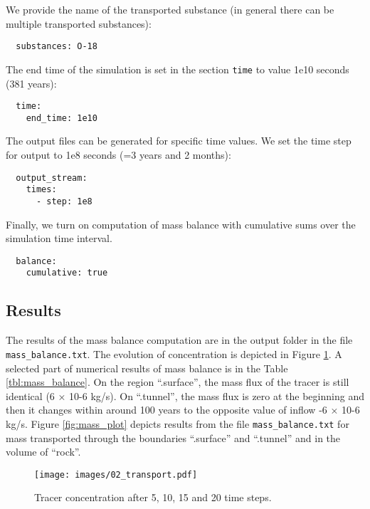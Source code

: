 We provide the name of the transported substance (in general there can
be multiple transported substances):

\begin{verbatim}
  substances: O-18
\end{verbatim}

The end time of the simulation is set in the section \texttt{time} to
value 1e10 seconds (381 years):

\begin{verbatim}
  time:
    end_time: 1e10
\end{verbatim}

The output files can be generated for specific time values. We set the
time step for output to 1e8 seconds (=3 years and 2 months):

\begin{verbatim}
  output_stream:
    times:
      - step: 1e8
\end{verbatim}

Finally, we turn on computation of mass balance with cumulative sums
over the simulation time interval.

\begin{verbatim}
  balance:
    cumulative: true
\end{verbatim}

\subsection{Results}\label{results}

The results of the mass balance computation are in the output folder in
the file \texttt{mass\_balance.txt}. The evolution of concentration is
depicted in Figure \ref{fig:transport}. A selected part of numerical
results of mass balance is in the Table \ref{tbl:mass_balance}. On the
region ``.surface'', the mass flux of the tracer is still identical (6 ×
10-6 kg/s). On ``.tunnel'', the mass flux is zero at the beginning and
then it changes within around 100 years to the opposite value of inflow
-6 × 10-6 kg/s. Figure \ref{fig:mass_plot} depicts results from the file
\texttt{mass\_balance.txt} for mass transported through the boundaries
``.surface'' and ``.tunnel'' and in the volume of ``rock''.

\begin{figure}[htbp]
\centering
\texttt{[image: images/02\_transport.pdf]}
\caption{Tracer concentration after 5, 10, 15 and 20 time
steps.\label{fig:transport}}
\end{figure}

